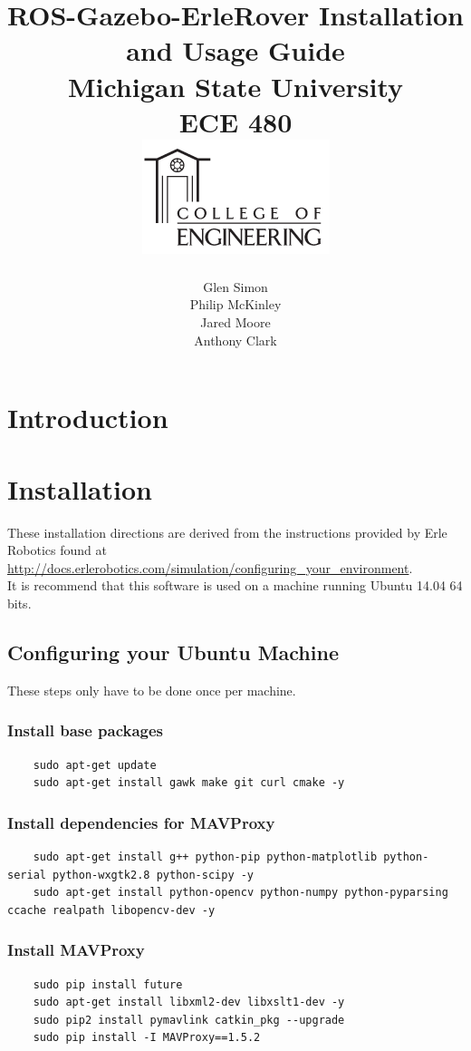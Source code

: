 \documentclass{report}
\title
{
	\textbf{{ROS-Gazebo-ErleRover Installation and Usage Guide}\\
	{Michigan State University}\\
	{ECE 480}\\}
	\includegraphics{Images/MSU_Lab_Cover_Image.png}
}
\author{Glen Simon\\
Philip McKinley\\
Jared Moore\\
Anthony Clark}
\begin{document}
\maketitle

\newpage
\tableofcontents
\clearpage

\chapter{Introduction}

\chapter{Installation}
These installation directions are derived from the instructions provided by Erle Robotics found at\\ \href{http://docs.erlerobotics.com/simulation/configuring\_your\_environment}{http://docs.erlerobotics.com/simulation/configuring\_your\_environment}.
\\

It is recommend that this software is used on a machine running Ubuntu 14.04 64 bits.

\section{Configuring your Ubuntu Machine}
These steps only have to be done once per machine.
\subsection{Install base packages}
\begin{lstlisting}
	sudo apt-get update
	sudo apt-get install gawk make git curl cmake -y
\end{lstlisting}

\subsection{Install dependencies for MAVProxy}
\begin{lstlisting}
	sudo apt-get install g++ python-pip python-matplotlib python-serial python-wxgtk2.8 python-scipy -y
	sudo apt-get install python-opencv python-numpy python-pyparsing ccache realpath libopencv-dev -y
\end{lstlisting}

\subsection{Install MAVProxy}
\begin{lstlisting}
	sudo pip install future
	sudo apt-get install libxml2-dev libxslt1-dev -y
	sudo pip2 install pymavlink catkin_pkg --upgrade
	sudo pip install -I MAVProxy==1.5.2
\end{lstlisting}
\end{document}

